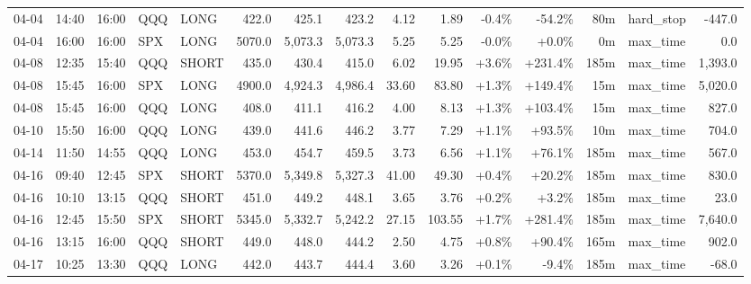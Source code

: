 \documentclass[11pt,a4paper,twoside]{article}
\begin{document}
\begin{landscape}
\begin{center}
\begin{longtable}{>{\color{txtmain}}l l l l l r r r r r r r r >{\color{txtmain}}l r}
04-04 & 14:40 & 16:00 & QQQ & LONG & 422.0 & 425.1 & 423.2 & 4.12 & 1.89 & \textcolor{lossred}{-0.4\%} & \textcolor{lossred}{-54.2\%} & 80m & hard\_stop & \textcolor{lossred}{-447.0} \\
04-04 & 16:00 & 16:00 & SPX & LONG & 5070.0 & 5,073.3 & 5,073.3 & 5.25 & 5.25 & \textcolor{lossred}{-0.0\%} & \textcolor{wingreen}{+0.0\%} & 0m & max\_time & \textcolor{wingreen}{0.0} \\
04-08 & 12:35 & 15:40 & QQQ & SHORT & 435.0 & 430.4 & 415.0 & 6.02 & 19.95 & \textcolor{wingreen}{+3.6\%} & \textcolor{wingreen}{+231.4\%} & 185m & max\_time & \textcolor{wingreen}{1,393.0} \\
04-08 & 15:45 & 16:00 & SPX & LONG & 4900.0 & 4,924.3 & 4,986.4 & 33.60 & 83.80 & \textcolor{wingreen}{+1.3\%} & \textcolor{wingreen}{+149.4\%} & 15m & max\_time & \textcolor{wingreen}{5,020.0} \\
04-08 & 15:45 & 16:00 & QQQ & LONG & 408.0 & 411.1 & 416.2 & 4.00 & 8.13 & \textcolor{wingreen}{+1.3\%} & \textcolor{wingreen}{+103.4\%} & 15m & max\_time & \textcolor{wingreen}{827.0} \\
04-10 & 15:50 & 16:00 & QQQ & LONG & 439.0 & 441.6 & 446.2 & 3.77 & 7.29 & \textcolor{wingreen}{+1.1\%} & \textcolor{wingreen}{+93.5\%} & 10m & max\_time & \textcolor{wingreen}{704.0} \\
04-14 & 11:50 & 14:55 & QQQ & LONG & 453.0 & 454.7 & 459.5 & 3.73 & 6.56 & \textcolor{wingreen}{+1.1\%} & \textcolor{wingreen}{+76.1\%} & 185m & max\_time & \textcolor{wingreen}{567.0} \\
04-16 & 09:40 & 12:45 & SPX & SHORT & 5370.0 & 5,349.8 & 5,327.3 & 41.00 & 49.30 & \textcolor{wingreen}{+0.4\%} & \textcolor{wingreen}{+20.2\%} & 185m & max\_time & \textcolor{wingreen}{830.0} \\
04-16 & 10:10 & 13:15 & QQQ & SHORT & 451.0 & 449.2 & 448.1 & 3.65 & 3.76 & \textcolor{wingreen}{+0.2\%} & \textcolor{wingreen}{+3.2\%} & 185m & max\_time & \textcolor{wingreen}{23.0} \\
04-16 & 12:45 & 15:50 & SPX & SHORT & 5345.0 & 5,332.7 & 5,242.2 & 27.15 & 103.55 & \textcolor{wingreen}{+1.7\%} & \textcolor{wingreen}{+281.4\%} & 185m & max\_time & \textcolor{wingreen}{7,640.0} \\
04-16 & 13:15 & 16:00 & QQQ & SHORT & 449.0 & 448.0 & 444.2 & 2.50 & 4.75 & \textcolor{wingreen}{+0.8\%} & \textcolor{wingreen}{+90.4\%} & 165m & max\_time & \textcolor{wingreen}{902.0} \\
04-17 & 10:25 & 13:30 & QQQ & LONG & 442.0 & 443.7 & 444.4 & 3.60 & 3.26 & \textcolor{wingreen}{+0.1\%} & \textcolor{lossred}{-9.4\%} & 185m & max\_time & \textcolor{lossred}{-68.0} \\

\end{longtable}
\end{center}
\end{landscape}
\end{document}
